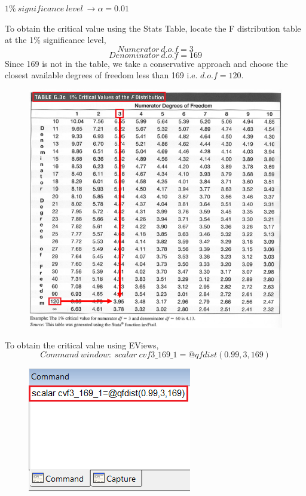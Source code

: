 \documentclass[12pt]{report}
\begin{document}
\noindent $1\%\ significance\ level\ \to \alpha = 0.01$

\noindent To obtain the critical value using the Stats Table, locate the F distribution table at the 1\% significance level,
$$Numerator\ d.o.f = 3$$
$$Denominator\ d.o.f = 169$$
\noindent Since 169 is not in the table, we take a conservative approach and choose the closest available degrees of freedom less than 169 i.e. $d.o.f=120$. 
\begin{figure}[H]
	\centering
	\includegraphics{q1_5}
\end{figure}
\vspace{-\baselineskip}
\noindent To obtain the critical value using EViews,
$$Command\ window:\ scalar\ cvf3\_169\_1=@qfdist(0.99,3,169)$$
\begin{figure}[H]
	\centering
	\includegraphics{q1_6}
\end{figure}
\end{document}
